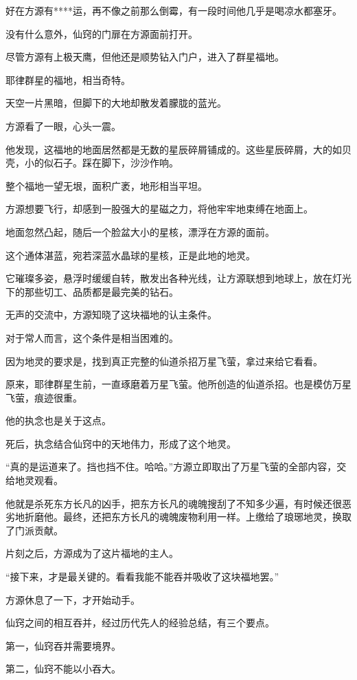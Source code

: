 \begin{this_body}
好在方源有****运，再不像之前那么倒霉，有一段时间他几乎是喝凉水都塞牙。

没有什么意外，仙窍的门扉在方源面前打开。

尽管方源有上极天鹰，但他还是顺势钻入门户，进入了群星福地。

耶律群星的福地，相当奇特。

天空一片黑暗，但脚下的大地却散发着朦胧的蓝光。

方源看了一眼，心头一震。

他发现，这福地的地面居然都是无数的星辰碎屑铺成的。这些星辰碎屑，大的如贝壳，小的似石子。踩在脚下，沙沙作响。

整个福地一望无垠，面积广袤，地形相当平坦。

方源想要飞行，却感到一股强大的星磁之力，将他牢牢地束缚在地面上。

地面忽然凸起，随后一个脸盆大小的星核，漂浮在方源的面前。

这个通体湛蓝，宛若深蓝水晶球的星核，正是此地的地灵。

它璀璨多姿，悬浮时缓缓自转，散发出各种光线，让方源联想到地球上，放在灯光下的那些切工、品质都是最完美的钻石。

无声的交流中，方源知晓了这块福地的认主条件。

对于常人而言，这个条件是相当困难的。

因为地灵的要求是，找到真正完整的仙道杀招万星飞萤，拿过来给它看看。

原来，耶律群星生前，一直琢磨着万星飞萤。他所创造的仙道杀招。也是模仿万星飞萤，痕迹很重。

他的执念也是关于这点。

死后，执念结合仙窍中的天地伟力，形成了这个地灵。

“真的是运道来了。挡也挡不住。哈哈。”方源立即取出了万星飞萤的全部内容，交给地灵观看。

他就是杀死东方长凡的凶手，把东方长凡的魂魄搜刮了不知多少遍，有时候还很恶劣地折磨他。最终，还把东方长凡的魂魄废物利用一样。上缴给了琅琊地灵，换取了门派贡献。

片刻之后，方源成为了这片福地的主人。

“接下来，才是最关键的。看看我能不能吞并吸收了这块福地罢。”

方源休息了一下，才开始动手。

仙窍之间的相互吞并，经过历代先人的经验总结，有三个要点。

第一，仙窍吞并需要境界。

第二，仙窍不能以小吞大。


\end{this_body}
